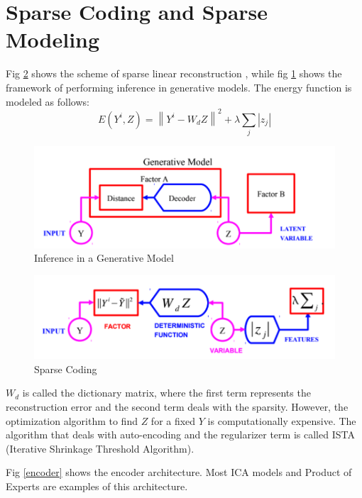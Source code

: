 \section*{Sparse Coding and Sparse Modeling}

Fig \ref{fig:sparse} shows the scheme of sparse linear reconstruction \cite{olshausen1997sparse}, while fig \ref{fig:generative} shows the framework of performing inference in generative models.
The energy function is modeled as follows:
\[E\left(Y^{i}, Z\right)=\left\|Y^{i}-W_{d} Z\right\|^{2}+\lambda \sum_{j}\left|z_{j}\right|\]
\begin{figure}[H]
\centering
\includegraphics[width=1.0\linewidth]{lectures/12-a/generative.png}
\caption{Inference in a Generative Model}
\label{fig:generative}
\end{figure}

\begin{figure}[H]
\centering
\includegraphics[width=1.0\linewidth]{lectures/12-a/sparse.png}
\caption{Sparse Coding}
\label{fig:sparse}
\end{figure}
$W_d$ is called the dictionary matrix, where the first term represents the reconstruction error and the second term deals with the sparsity. However, the optimization algorithm to find $Z$ for a fixed $Y$ is computationally expensive. The algorithm that deals with auto-encoding and the regularizer term is called ISTA (Iterative Shrinkage Threshold Algorithm). 

Fig \ref{encoder} shows the encoder architecture. Most ICA models and Product of Experts are examples of this architecture.

